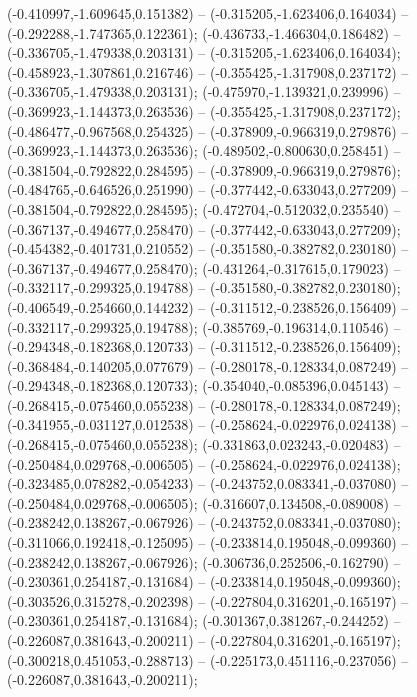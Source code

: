  (-0.410997,-1.609645,0.151382) -- (-0.315205,-1.623406,0.164034) -- (-0.292288,-1.747365,0.122361);
 (-0.436733,-1.466304,0.186482) -- (-0.336705,-1.479338,0.203131) -- (-0.315205,-1.623406,0.164034);
 (-0.458923,-1.307861,0.216746) -- (-0.355425,-1.317908,0.237172) -- (-0.336705,-1.479338,0.203131);
 (-0.475970,-1.139321,0.239996) -- (-0.369923,-1.144373,0.263536) -- (-0.355425,-1.317908,0.237172);
 (-0.486477,-0.967568,0.254325) -- (-0.378909,-0.966319,0.279876) -- (-0.369923,-1.144373,0.263536);
 (-0.489502,-0.800630,0.258451) -- (-0.381504,-0.792822,0.284595) -- (-0.378909,-0.966319,0.279876);
 (-0.484765,-0.646526,0.251990) -- (-0.377442,-0.633043,0.277209) -- (-0.381504,-0.792822,0.284595);
 (-0.472704,-0.512032,0.235540) -- (-0.367137,-0.494677,0.258470) -- (-0.377442,-0.633043,0.277209);
 (-0.454382,-0.401731,0.210552) -- (-0.351580,-0.382782,0.230180) -- (-0.367137,-0.494677,0.258470);
 (-0.431264,-0.317615,0.179023) -- (-0.332117,-0.299325,0.194788) -- (-0.351580,-0.382782,0.230180);
 (-0.406549,-0.254660,0.144232) -- (-0.311512,-0.238526,0.156409) -- (-0.332117,-0.299325,0.194788);
 (-0.385769,-0.196314,0.110546) -- (-0.294348,-0.182368,0.120733) -- (-0.311512,-0.238526,0.156409);
 (-0.368484,-0.140205,0.077679) -- (-0.280178,-0.128334,0.087249) -- (-0.294348,-0.182368,0.120733);
 (-0.354040,-0.085396,0.045143) -- (-0.268415,-0.075460,0.055238) -- (-0.280178,-0.128334,0.087249);
 (-0.341955,-0.031127,0.012538) -- (-0.258624,-0.022976,0.024138) -- (-0.268415,-0.075460,0.055238);
 (-0.331863,0.023243,-0.020483) -- (-0.250484,0.029768,-0.006505) -- (-0.258624,-0.022976,0.024138);
 (-0.323485,0.078282,-0.054233) -- (-0.243752,0.083341,-0.037080) -- (-0.250484,0.029768,-0.006505);
 (-0.316607,0.134508,-0.089008) -- (-0.238242,0.138267,-0.067926) -- (-0.243752,0.083341,-0.037080);
 (-0.311066,0.192418,-0.125095) -- (-0.233814,0.195048,-0.099360) -- (-0.238242,0.138267,-0.067926);
 (-0.306736,0.252506,-0.162790) -- (-0.230361,0.254187,-0.131684) -- (-0.233814,0.195048,-0.099360);
 (-0.303526,0.315278,-0.202398) -- (-0.227804,0.316201,-0.165197) -- (-0.230361,0.254187,-0.131684);
 (-0.301367,0.381267,-0.244252) -- (-0.226087,0.381643,-0.200211) -- (-0.227804,0.316201,-0.165197);
 (-0.300218,0.451053,-0.288713) -- (-0.225173,0.451116,-0.237056) -- (-0.226087,0.381643,-0.200211);
